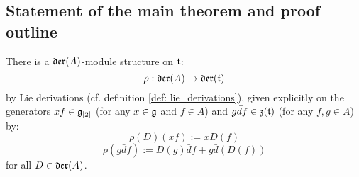     \subsection{Statement of the main theorem and proof outline}
        \begin{lemma} \label{lemma: vector_field_action_on_toroidal_lie_algebras} 
            There is a $\mathfrak{der}(A)$-module structure on $\mathfrak{t}$:
                $$\rho: \mathfrak{der}(A) \to \mathfrak{der}(\mathfrak{t})$$
            by Lie derivations (cf. definition \ref{def: lie_derivations}), given explicitly on the generators $xf \in \mathfrak{g}_{[2]}$ (for any $x \in \mathfrak{g}$ and $f \in A$) and $g \bar{d}f \in \mathfrak{z}(\mathfrak{t})$ (for any $f, g \in A$) by:
                $$\rho(D)( xf ) := x D(f)$$
                $$\rho( g\bar{d}f ) := D(g) \bar{d}f + g \bar{d}(D(f))$$
            for all $D \in \mathfrak{der}(A)$.
        \end{lemma}
